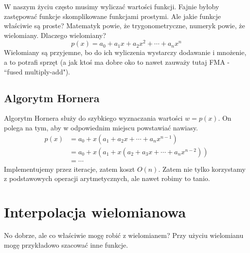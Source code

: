 \documentclass[hidelinks,a4paper,fleqn,oneside]{book}
\begin{document}
W naszym życiu często musimy wyliczać wartości funkcji. Fajnie byłoby zastępować funkcje skomplikowane funkcjami prostymi. Ale jakie funkcje właściwie są proste? Matematyk powie, że trygonometryczne, numeryk powie, że wielomiany. Dlaczego wielomiany?
\[
p(x) = a_0 + a_1x + a_2x^2 + \cdots + a_nx^n
\]
Wielomiany są przyjemne, bo do ich wyliczenia wystarczy dodawanie i mnożenie, a to potrafi sprzęt (a jak ktoś ma dobre oko to nawet zauważy tutaj FMA - ``fused multiply-add").

\subsection{Algorytm Hornera} 
Algorytm Hornera służy do szybkiego wyznaczania wartości $w = p(x)$. On polega na tym, aby w odpowiednim miejscu powstawiać nawiasy.
\begin{align*}
	p(x) & = a_0 + x(a_1 + a_2x + \cdots + a_nx^{n-1}) \\
	& = a_0 + x (a_1 + x(a_2 + a_3 x + \cdots + a_nx^{n-2})) \\
	& = \cdots
\end{align*}
Implementujemy przez iteracje, zatem koszt $O(n)$. Zatem nie tylko korzystamy z podstawowych operacji arytmetycznych, ale nawet robimy to tanio. 

\section{Interpolacja wielomianowa}
No dobrze, ale co właściwie mogę robić z wielomianem? Przy użyciu wielomianu mogę przykładowo szacować inne funkcje.
\end{document}
